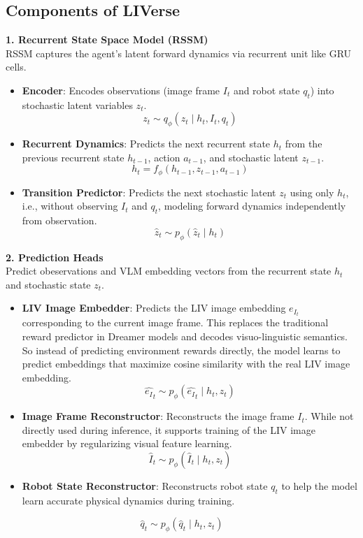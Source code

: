\documentclass[11pt]{article}
\begin{document}
\subsection{Components of LIVerse}
\textbf{1. Recurrent State Space Model (RSSM)}\\
RSSM captures the agent's latent forward dynamics via recurrent unit like GRU cells.
\begin{itemize}
\setlength\itemindent{20pt}
    \item \textbf{Encoder}: Encodes observations (image frame $I_t$ and robot state $q_t$) into stochastic latent variables $z_t$.
\begin{equation}
z_t \sim q_\phi(z_t \mid h_t, I_t, q_t)
\end{equation}
    \item \textbf{Recurrent Dynamics}: Predicts the next recurrent state $h_t$ from the previous recurrent state $h_{t-1}$, action $a_{t-1}$, and stochastic latent $z_{t-1}$.
\begin{equation}
h_t = f_\phi(h_{t-1}, z_{t-1}, a_{t-1})
\end{equation}
    \item \textbf{Transition Predictor}: Predicts the next stochastic latent $z_t$ using only $h_t$, i.e., without observing $I_t$ and $q_t$, modeling forward dynamics independently from observation.
\begin{equation}
\hat{z}_t \sim p_\phi(\hat{z}_t \mid h_t)
\end{equation}
\end{itemize}

\textbf{2. Prediction Heads}\\
Predict obeservations and VLM embedding vectors from the recurrent state $h_t$ and stochastic state $z_t$.
\begin{itemize}
\setlength\itemindent{20pt}
    \item \textbf{LIV Image Embedder}: Predicts the LIV image embedding $e_{I_t}$ corresponding to the current image frame. This replaces the traditional reward predictor in Dreamer models and decodes visuo-linguistic semantics. So instead of predicting environment rewards directly, the model learns to predict embeddings that maximize cosine similarity with the real LIV image embedding.
\begin{equation}
\hat{e_I}_t \sim p_\phi(\hat{e_I}_t \mid h_t, z_t)
\end{equation}
    \item \textbf{Image Frame Reconstructor}: Reconstructs the image frame $I_t$. While not directly used during inference, it supports training of the LIV image embedder by regularizing visual feature learning.
\begin{equation}
\hat{I}_t \sim p_\phi(\hat{I}_t \mid h_t, z_t)
\end{equation}
    \item \textbf{Robot State Reconstructor}: Reconstructs robot state $q_t$ to help the model learn accurate physical dynamics during training.
\end{itemize}
\begin{equation}
\hat{q}_t \sim p_\phi(\hat{q}_t \mid h_t, z_t)
\end{equation}
\end{document}
